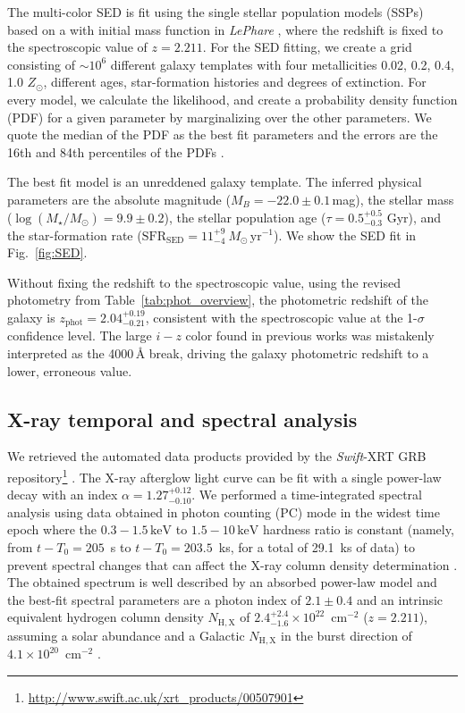 \documentclass[referee]{aa}
\begin{document}
The multi-color SED is fit using the \citet{Bruzual2003} single stellar
population models (SSPs) based on a \citet{Chabrier2003} with initial mass
function in \emph{LePhare} \citep{Ilbert2006}, where the redshift is fixed to
the spectroscopic value of $z=2.211$. For the SED fitting, we create a grid
consisting of $\sim 10^6$  different galaxy templates with four metallicities
0.02, 0.2, 0.4, 1.0 $Z_{\odot}$, different ages, star-formation histories and
degrees of extinction. For every model, we calculate the likelihood, and create
a probability density function (PDF) for a given parameter by marginalizing over
the other parameters. We quote the median of the PDF as the best fit parameters
and the errors are the 16th and 84th percentiles of the PDFs \citep[e.g.
see][for details on the SED fitting procedure]{Schulze2016}.

The best fit model is an unreddened galaxy template. The inferred physical
parameters are the absolute magnitude ($M_B=-22.0\pm0.1$\,mag), the stellar mass
($\log(M_{\star}/M_\odot) = 9.9\pm0.2$), the stellar population age ($\tau =
0.5_{-0.3}^{+0.5}$ Gyr), and the star-formation rate
($\mathrm{SFR}_{\mathrm{SED}} = 11_{-4}^{+9}~M_\odot\,\mathrm{yr}^{-1}$). We
show the SED fit in Fig.~\ref{fig:SED}.

Without fixing the redshift to the spectroscopic value, using the revised
photometry from Table~\ref{tab:phot_overview}, the photometric redshift of the
galaxy is $z_{\mathrm{phot}}=2.04_{-0.21}^{+0.19}$, consistent with the
spectroscopic value at the 1-$\sigma$ confidence level. The large $i-z$ color
found in previous works was mistakenly interpreted as the 4000\,\AA{} break,
driving the galaxy photometric redshift to a lower, erroneous value.

\subsection{X-ray temporal and spectral analysis}\label{xray}

We retrieved the automated data products provided by the \textit{Swift}-XRT GRB
repository\footnote{\url{http://www.swift.ac.uk/xrt\_products/00507901}}
\citep{Evans2009}. 
The X-ray afterglow light curve can be fit with a single power-law decay with an
index $\alpha=1.27_{-0.10}^{+0.12}$. We performed a time-integrated spectral
analysis using data obtained in photon counting (PC) mode in the widest time epoch where
the $0.3-1.5\,\mathrm{keV}$ to $1.5-10\,\mathrm{keV}$ hardness ratio is constant
(namely, from $t-T_0 = 205$~s to $t-T_0 = 203.5$~ks, for a total of 29.1~ks of
data) to prevent spectral changes that can affect the X-ray column density
determination \citep{Kopac2012}. 
The obtained spectrum is well described by an absorbed power-law
model and the best-fit spectral parameters are a photon index of $2.1 \pm 0.4$ and
an intrinsic equivalent hydrogen column density $N_{\mathrm{H,X}}$ of $2.4_{-1.6}^{+2.4}
\times 10^{22}$~cm$^{-2}$ ($z=2.211$), assuming a solar abundance and a Galactic $N_{\mathrm{H,X}}$ in
the burst direction of $4.1 \times 10^{20}$~cm$^{-2}$ \citep{Willingale2013}.
\end{document}
